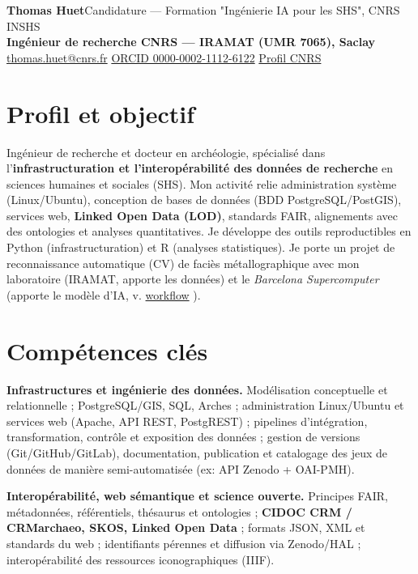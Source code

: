 \documentclass[10pt,a4paper]{article}
\begin{document}
{\LARGE\bfseries Thomas Huet}\hfill {\small Candidature --- Formation "Ingénierie IA pour les SHS", CNRS INSHS}\\[-1pt]
\newline
{\bfseries Ingénieur de recherche CNRS --- IRAMAT (UMR 7065), Saclay}\\
\href{mailto:thomas.huet@cnrs.fr}{thomas.huet@cnrs.fr} \quad\textbar\quad \href{https://orcid.org/0000-0002-1112-6122}{ORCID 0000-0002-1112-6122} \quad\textbar\quad \href{https://iramat.cnrs.fr/user/thomas.huet/}{Profil CNRS}

\section*{Profil et objectif}
Ingénieur de recherche et docteur en archéologie, spécialisé dans l'\textbf{infrastructuration et l'interopérabilité des données de recherche} en sciences humaines et sociales (SHS). Mon activité relie administration système (Linux/Ubuntu), conception de bases de données (BDD PostgreSQL/PostGIS), services web, \textbf{Linked Open Data (LOD)}, standards FAIR, alignements avec des ontologies et analyses quantitatives. Je développe des outils reproductibles en Python (infrastructuration) et R (analyses statistiques). Je porte un projet de reconnaissance automatique (CV) de faciès métallographique avec mon laboratoire (IRAMAT, apporte les données) et le \textit{Barcelona Supercomputer} (apporte le modèle d'IA, v. \href{https://github.com/iramat/iramat-dev/tree/main/talks/2026-bsc#worflow}{workflow} ). 

\section*{Compétences clés}
\textbf{Infrastructures et ingénierie des données.} Modélisation conceptuelle et relationnelle ; PostgreSQL/GIS, SQL, Arches ; administration Linux/Ubuntu et services web (Apache, API REST, PostgREST) ; pipelines d'intégration, transformation, contrôle et exposition des données ; gestion de versions (Git/GitHub/GitLab), documentation, publication et catalogage des jeux de données de manière semi-automatisée (ex: API Zenodo + OAI-PMH).

\textbf{Interopérabilité, web sémantique et science ouverte.} Principes FAIR, métadonnées, référentiels, thésaurus et ontologies ; \textbf{CIDOC CRM / CRMarchaeo, SKOS, Linked Open Data} ; formats JSON, XML et standards du web ; identifiants pérennes et diffusion via Zenodo/HAL ; interopérabilité des ressources iconographiques (IIIF).
\end{document}
